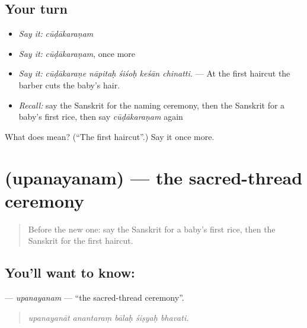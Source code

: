 \subsection*{Your turn}
\begin{itemize}
\raggedright
  \item \emph{Say it:} \emph{cūḍākaraṇam}
  \item \emph{Say it:} \emph{cūḍākaraṇam}, once more
  \item \emph{Say it:} \emph{cūḍākaraṇe nāpitaḥ śiśoḥ keśān chinatti.} — At the first haircut the barber cuts the baby's hair.
  \item \emph{Recall:} say the Sanskrit for the naming ceremony, then the Sanskrit for a baby's first rice, then say \emph{cūḍākaraṇam} again
\end{itemize}

\begin{tcolorbox}[breakable,colback=teal!4,colframe=teal!35!black,title={Before you move on}]
What does  mean? (\textquotedblleft{}The first haircut\textquotedblright{}.) Say it once more.
\end{tcolorbox}
\section[\texorpdfstring{\sk{उपनयनम्} (upanayanam)}{उपनयनम् (upanayanam)}]{ (upanayanam) — the sacred-thread ceremony}

\label{lesson:SA-C493-upanayanam}



\begin{quote}
Before the new one: say the Sanskrit for a baby's first rice, then the Sanskrit for the first haircut.
\end{quote}

\subsection*{You'll want to know: }
\textbf{} — \emph{upanayanam} — \textquotedblleft{}the sacred-thread ceremony\textquotedblright{}.

\begin{quote}
    
\end{quote}

\begin{quote}
\emph{upanayanāt anantaraṃ bālaḥ śiṣyaḥ bhavati.}
\end{quote}

